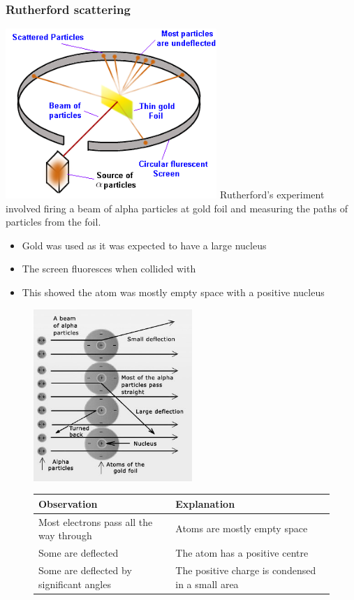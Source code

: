 \documentclass[12pt]{article}
\begin{document}
\subsubsection{Rutherford scattering}
\includegraphics[width=8cm]{scatter.png}
Rutherford's experiment involved firing a beam of alpha particles at gold foil and measuring the paths of particles from the foil.
\begin{itemize}
\item Gold was used as it was expected to have a large nucleus
\item The screen fluoresces when collided with
\item This showed the atom was mostly empty space with a positive nucleus
\end{itemize}
\begin{figure}[H]
    \centering
    \begin{minipage}{0.45\textwidth}
        \centering
        
\includegraphics[width=6cm]{foil.jpg}  
    \end{minipage}\hfill
    \begin{minipage}{0.45\textwidth}
        \centering
\begin{tabularx}{\textwidth}{|X|X|}
\hline
Observation&Explanation\\
\hline
Most electrons pass all the way through&Atoms are mostly empty space\\
\hline
Some are deflected&The atom has a positive centre\\
\hline
Some are deflected by significant angles&The positive charge is condensed in a small area\\
\hline
\end{tabularx}
    \end{minipage}
\end{figure}
\end{document}
